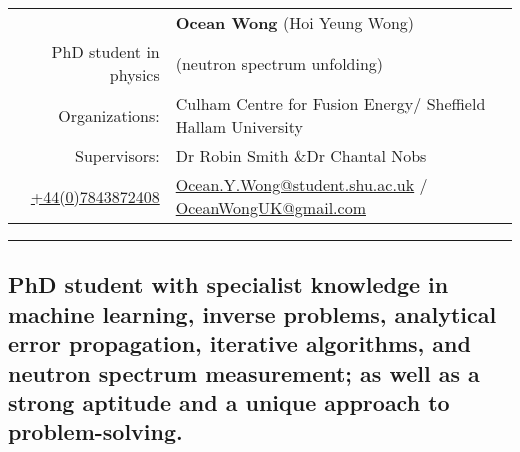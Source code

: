 \documentclass[a4paper, 12pt]{article}
\begin{document}
\begin{table}[H]
\centering
\begin{tabular}{rl}
&\textbf{Ocean Wong} (Hoi Yeung Wong)    \\
PhD student in physics& (neutron spectrum unfolding) \\
Organizations: &Culham Centre for Fusion Energy/ Sheffield Hallam University\\
Supervisors: &Dr Robin Smith \&Dr Chantal Nobs\\
\href{tel:07843872408}{+44(0)7843872408} & \href{mailto:Ocean.Y.Wong@student.shu.ac.uk}{Ocean.Y.Wong@student.shu.ac.uk} / \href{mailto:OceanWongUK@gmail.com}{OceanWongUK@gmail.com}
\end{tabular}
\end{table}
\hrule
\begin{center}
\chapter{PhD student with specialist knowledge in machine learning, inverse problems, analytical error propagation, iterative algorithms, and neutron spectrum measurement; as well as a strong aptitude and a unique approach to problem-solving. %
}
\end{center}
\end{document}
